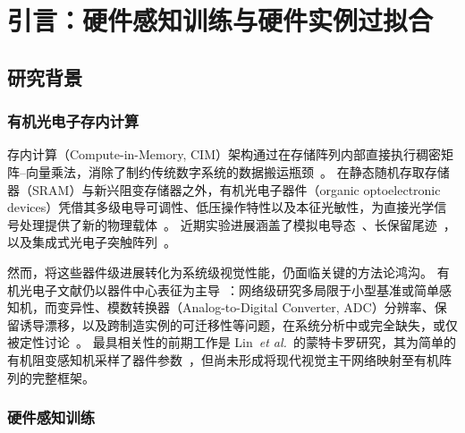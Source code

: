 
\chapter{引言：硬件感知训练与硬件实例过拟合}
\label{chap:hat-instance-overfitting}

\section{研究背景}

\subsection{有机光电子存内计算}

存内计算（Compute-in-Memory, CIM）架构通过在存储阵列内部直接执行稠密矩阵--向量乘法，消除了制约传统数字系统的数据搬运瓶颈~\citep{horowitz2014computing,peng2020dnnneurosim,lanza2025memristor}。
在静态随机存取存储器（SRAM）与新兴阻变存储器之外，有机光电子器件（organic optoelectronic devices）凭借其多级电导可调性、低压操作特性以及本征光敏性，为直接光学信号处理提供了新的物理载体~\citep{xu2025emerging,guo2024organic,photonics2025organicreview}。
近期实验进展涵盖了模拟电导态~\citep{guo2024organic,jung2024organicfilaments}、长保留尾迹~\citep{zeng2023organicmemristor}，以及集成式光电子突触阵列~\citep{gebregiorgis2023organiccim,zhang2025opect,liu2024wearable}。

然而，将这些器件级进展转化为系统级视觉性能，仍面临关键的方法论鸿沟。
有机光电子文献仍以器件中心表征为主导~\citep{harikesh2024oeneurons}：网络级研究多局限于小型基准或简单感知机，而变异性、模数转换器（Analog-to-Digital Converter, ADC）分辨率、保留诱导漂移，以及跨制造实例的可迁移性等问题，在系统分析中或完全缺失，或仅被定性讨论~\citep{zeng2023organicmemristor,jung2024organicfilaments}。
最具相关性的前期工作是 Lin~\emph{et al.}~的蒙特卡罗研究，其为简单的有机阻变感知机采样了器件参数~\citep{lin2016physical}，但尚未形成将现代视觉主干网络映射至有机阵列的完整框架。

\subsection{硬件感知训练}

